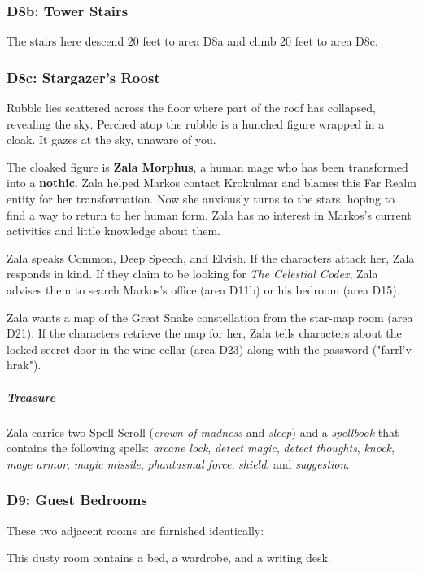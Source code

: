 \documentclass[10pt,a4paper,twoside,bg=print,twocolumn,openany,nodeprecatedcode]{dndbook}
\begin{document}
\subsubsection{D8b: Tower Stairs}
The stairs here descend 20 feet to area D8a and climb 20 feet to area D8c.

\subsubsection{D8c: Stargazer's Roost}
\begin{DndReadAloud}{}
Rubble lies scattered across the floor where part of the roof has collapsed, revealing the sky. Perched atop the rubble is a hunched figure wrapped in a cloak. It gazes at the sky, unaware of you.

\end{DndReadAloud}

The cloaked figure is \textbf{Zala Morphus}, a human mage who has been transformed into a \textbf{nothic}. Zala helped Markos contact Krokulmar and blames this Far Realm entity for her transformation. Now she anxiously turns to the stars, hoping to find a way to return to her human form. Zala has no interest in Markos's current activities and little knowledge about them.

Zala speaks Common, Deep Speech, and Elvish. If the characters attack her, Zala responds in kind. If they claim to be looking for \textit{The Celestial Codex}, Zala advises them to search Markos's office (area D11b) or his bedroom (area D15).

Zala wants a map of the Great Snake constellation from the star-map room (area D21). If the characters retrieve the map for her, Zala tells characters about the locked secret door in the wine cellar (area D23) along with the password ("farrl'v hrak").

\subparagraph{Treasure}
Zala carries two Spell Scroll (\textit{crown of madness} and \textit{sleep}) and a \textit{spellbook} that contains the following spells: \textit{arcane lock}, \textit{detect magic}, \textit{detect thoughts}, \textit{knock}, \textit{mage armor}, \textit{magic missile}, \textit{phantasmal force}, \textit{shield}, and \textit{suggestion}.

\subsubsection{D9: Guest Bedrooms}
These two adjacent rooms are furnished identically:

\begin{DndReadAloud}{}
This dusty room contains a bed, a wardrobe, and a writing desk.

\end{DndReadAloud}
\end{document}
